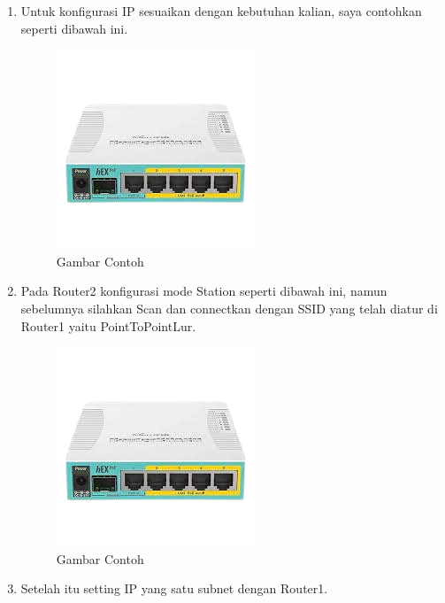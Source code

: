 \begin{center}
\begin{enumerate}
		\item Untuk konfigurasi IP sesuaikan dengan kebutuhan kalian, saya contohkan seperti dibawah ini.
		\begin{figure}[H]
			\centering
			\includegraphics[width=0.7\linewidth]{P1/img/contoh.png}
			\caption{Gambar Contoh}
			\label{fig:gambarcontoh}
		\end{figure}
		\item Pada Router2 konfigurasi mode Station seperti dibawah ini, namun sebelumnya silahkan Scan dan connectkan dengan SSID yang telah diatur di Router1 yaitu PointToPointLur.
		\begin{figure}[H]
			\centering
			\includegraphics[width=0.7\linewidth]{P1/img/contoh.png}
			\caption{Gambar Contoh}
			\label{fig:gambarcontoh}
		\end{figure}
		\item Setelah itu setting IP yang satu subnet dengan Router1.

\end{enumerate}
\end{center}
